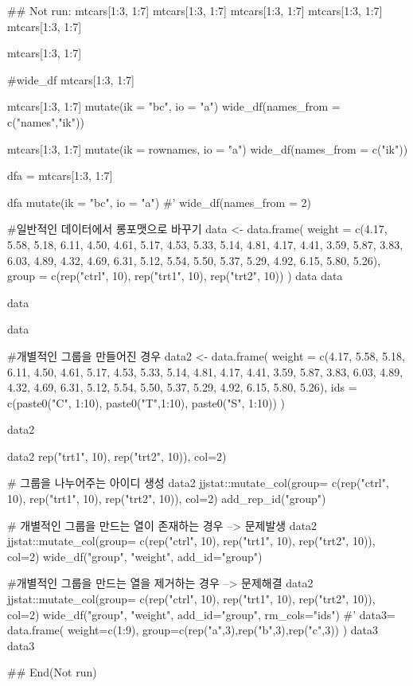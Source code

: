 \documentclass[a4paper]{book}
\begin{document}
\begin{Examples}
\begin{ExampleCode}

\#\# Not run: 
mtcars[1:3, 1:7]
mtcars[1:3, 1:7] %
mtcars[1:3, 1:7] %
mtcars[1:3, 1:7] %
mtcars[1:3, 1:7] %

mtcars[1:3, 1:7] %

#wide_df
mtcars[1:3, 1:7] %

mtcars[1:3, 1:7] %
  mutate(ik = "bc", io = "a")%
  wide_df(names_from = c("names","ik"))


mtcars[1:3, 1:7] %
  mutate(ik = rownames, io = "a")%
  wide_df(names_from = c("ik"))%

dfa = mtcars[1:3, 1:7] %

dfa%
  mutate(ik = "bc", io = "a")%
#'   wide_df(names_from = 2)


#일반적인 데이터에서  롱포맷으로 바꾸기
data <- data.frame(
  weight = c(4.17, 5.58, 5.18, 6.11, 4.50, 4.61, 5.17, 4.53, 5.33, 5.14,
             4.81, 4.17, 4.41, 3.59, 5.87, 3.83, 6.03, 4.89, 4.32, 4.69,
             6.31, 5.12, 5.54, 5.50, 5.37, 5.29, 4.92, 6.15, 5.80, 5.26),
  group = c(rep("ctrl", 10), rep("trt1", 10), rep("trt2", 10))
)
data
data%

data%

data  %


#개별적인 그룹을 만들어진 경우
data2 <- data.frame(
  weight = c(4.17, 5.58, 5.18, 6.11, 4.50, 4.61, 5.17, 4.53, 5.33, 5.14,
             4.81, 4.17, 4.41, 3.59, 5.87, 3.83, 6.03, 4.89, 4.32, 4.69,
             6.31, 5.12, 5.54, 5.50, 5.37, 5.29, 4.92, 6.15, 5.80, 5.26),
  ids = c(paste0("C", 1:10), paste0("T",1:10), paste0("S", 1:10))
)

data2

data2 %
                 rep("trt1", 10), rep("trt2", 10)), col=2)

# 그룹을 나누어주는 아이디 생성
data2 %
jjstat::mutate_col(group= c(rep("ctrl", 10),
        rep("trt1", 10), rep("trt2", 10)), col=2)%
        add_rep_id("group")

# 개별적인 그룹을 만드는 열이 존재하는 경우 --> 문제발생
data2 %
    jjstat::mutate_col(group= c(rep("ctrl", 10),
          rep("trt1", 10), rep("trt2", 10)), col=2)%
          wide_df("group", "weight", add_id="group")

#개별적인 그룹을 만드는 열을 제거하는 경우 --> 문제해결
data2 %
  jjstat::mutate_col(group= c(rep("ctrl", 10),
  rep("trt1", 10), rep("trt2", 10)),  col=2)%
  wide_df("group", "weight", add_id="group", rm_cols="ids") %
#'
data3= data.frame(
  weight=c(1:9),
  group=c(rep("a",3),rep("b",3),rep("c",3))
)
data3
data3 %

## End(Not run)

\end{ExampleCode}
\end{Examples}
\end{document}
